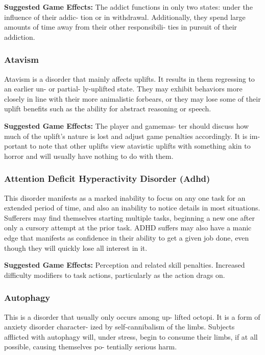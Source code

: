 \textbf{Suggested Game Effects: }The addict functions in 
only two states: under the influence of their addic-
tion or in withdrawal. Additionally, they spend large 
amounts of time away from their other responsibili-
ties in pursuit of their addiction.

\subsubsection{Atavism}

Atavism is a disorder that mainly affects uplifts. It 
results in them regressing to an earlier un- or partial-
ly-uplifted state. They may exhibit behaviors more 
closely in line with their more animalistic forbears, or 
they may lose some of their uplift benefits such as the 
ability for abstract reasoning or speech.

\textbf{Suggested Game Effects: }The player and gamemas-
ter should discuss how much of the uplift's nature is 
lost and adjust game penalties accordingly. It is im-
portant to note that other uplifts view atavistic uplifts 
with something akin to horror and will usually have 
nothing to do with them.

\subsubsection{Attention Deficit Hyperactivity Disorder (Adhd)}

This disorder manifests as a marked inability to focus 
on any one task for an extended period of time, and 
also an inability to notice details in most situations. 
Sufferers may find themselves starting multiple tasks, 
beginning a new one after only a cursory attempt at 
the prior task. ADHD suffers may also have a manic 
edge that manifests as confidence in their ability to get 
a given job done, even though they will quickly lose 
all interest in it.

\textbf{Suggested Game Effects:} Perception and related 
skill penalties. Increased difficulty modifiers to task 
actions, particularly as the action drags on.

\subsubsection{Autophagy}

This is a disorder that usually only occurs among up-
lifted octopi. It is a form of anxiety disorder character-
ized by self-cannibalism of the limbs. Subjects afflicted 
with autophagy will, under stress, begin to consume 
their limbs, if at all possible, causing themselves po-
tentially serious harm.

